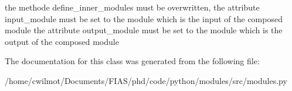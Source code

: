 the methode \textquotesingle{}define\+\_\+inner\+\_\+modules\textquotesingle{} must be overwritten, the attribute input\+\_\+module must be set to the module which is the input of the composed module the attribute output\+\_\+module must be set to the module which is the output of the composed module 

The documentation for this class was generated from the following file\+:\begin{DoxyCompactItemize}
\item 
/home/cwilmot/\+Documents/\+F\+I\+A\+S/phd/code/python/modules/src/modules.\+py\end{DoxyCompactItemize}
